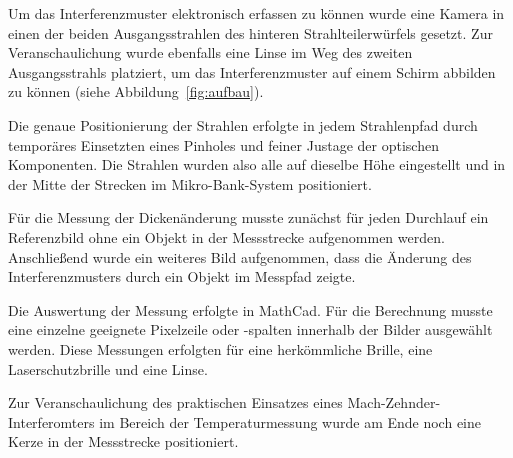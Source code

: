Um das Interferenzmuster elektronisch erfassen zu können wurde eine Kamera in einen der beiden Ausgangsstrahlen des hinteren Strahlteilerwürfels gesetzt. Zur Veranschaulichung wurde ebenfalls eine Linse im Weg des zweiten Ausgangsstrahls platziert, um das Interferenzmuster auf einem Schirm abbilden zu können (siehe Abbildung~\ref{fig:aufbau}).

Die genaue Positionierung der Strahlen erfolgte in jedem Strahlenpfad durch temporäres Einsetzten eines Pinholes und feiner Justage der optischen Komponenten. Die Strahlen wurden also alle auf dieselbe Höhe eingestellt und in der Mitte der Strecken im Mikro-Bank-System positioniert.

Für die Messung der Dickenänderung musste zunächst für jeden Durchlauf ein Referenzbild ohne ein Objekt in der Messstrecke aufgenommen werden. Anschließend wurde ein weiteres Bild aufgenommen, dass die Änderung des Interferenzmusters durch ein Objekt im Messpfad zeigte. 

Die Auswertung der Messung erfolgte in MathCad. Für die Berechnung musste eine einzelne geeignete Pixelzeile oder -spalten innerhalb der Bilder ausgewählt werden. Diese Messungen erfolgten für eine herkömmliche Brille, eine Laserschutzbrille und eine Linse.

Zur Veranschaulichung des praktischen Einsatzes eines Mach-Zehnder-Interferomters im Bereich der Temperaturmessung wurde am Ende noch eine Kerze in der Messstrecke positioniert.